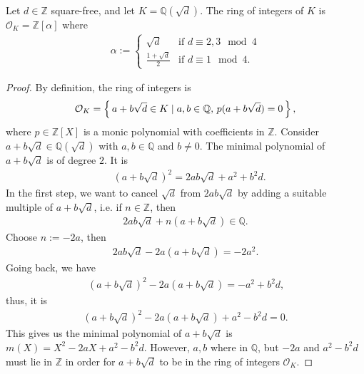 \begin{exmbox}
    \begin{example}
        Let \(d \in \mathbb{Z}\) square-free, and let \(K = \mathbb{Q}(\sqrt{d})\). The ring of integers of \(K\) is \(\mathcal{O}_K = \mathbb{Z}[\alpha]\) where
        \begin{align*}
            \alpha := \begin{cases}
                \sqrt{d} & \text{if } d \equiv 2, 3 \mod{4}\\
                \frac{1 + \sqrt{d}}{2} & \text{if } d \equiv 1 \mod{4} \text{.}
            \end{cases}
        \end{align*}
    \end{example}
\end{exmbox}
\begin{proof}
    By definition, the ring of integers is
    \begin{align*}
        \mathcal{O}_K = \left\{\, a + b \sqrt{d} \in K \mid a, b \in \mathbb{Q}, \, p(a + b \sqrt{d}) = 0 \,\right\} \text{,}
    \end{align*}
    where \(p \in \mathbb{Z}[X]\) is a monic polynomial with coefficients in \(\mathbb{Z}\). Consider \(a + b \sqrt{d}\in \mathbb{Q}(\sqrt{d})\) with \(a, b \in \mathbb{Q}\) and \(b \neq 0\). The minimal polynomial of \(a + b \sqrt{d}\) is of degree \(2\). It is
    \begin{align*}
        & (a + b \sqrt{d})^2 = 2 ab \sqrt{d} + a^2 + b^2 d \text{.}
    \end{align*}
    In the first step, we want to cancel \(\sqrt{d}\) from \(2 ab \sqrt{d}\) by adding a suitable multiple of \(a + b \sqrt{d}\), i.e. if \(n \in \mathbb{Z}\), then
    \begin{align*}
        2ab \sqrt{d} + n (a + b \sqrt{d}) \in \mathbb{Q} \text{.}
    \end{align*}
    Choose \(n := -2a\), then
    \begin{align*}
        2ab \sqrt{d} - 2a (a + b \sqrt{d}) = -2 a^2 \text{.}
    \end{align*}
    Going back, we have
    \begin{align*}
        (a + b \sqrt{d})^2 - 2a (a + b \sqrt{d}) = -a^2 + b^2 d \text{,}
    \end{align*}
    thus, it is
    \begin{align*}
        (a + b \sqrt{d})^2 - 2a (a + b \sqrt{d}) + a^2 - b^2 d = 0 \text{.}
    \end{align*}
    This gives us the minimal polynomial of \(a + b \sqrt{d}\) is \(m(X) = X^2 - 2a X + a^2 - b^2 d\). However, \(a, b\) where in \(\mathbb{Q}\), but \(-2a\) and \(a^2 - b^2d\) must lie in \(\mathbb{Z}\) in order for \(a + b \sqrt{d}\) to be in the ring of integers \(\mathcal{O}_K\).


\end{proof}
